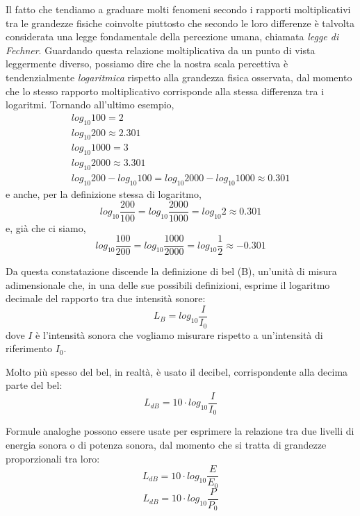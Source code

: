 \documentclass[11pt]{report}
\begin{document}
Il fatto che tendiamo a graduare molti fenomeni secondo i rapporti moltiplicativi tra le grandezze fisiche coinvolte piuttosto che secondo le loro differenze è talvolta considerata una legge fondamentale della percezione umana, chiamata \emph{legge di Fechner}. Guardando questa relazione moltiplicativa da un punto di vista leggermente diverso, possiamo dire che la nostra scala percettiva è tendenzialmente \emph{logaritmica} rispetto alla grandezza fisica osservata, dal momento che lo stesso rapporto moltiplicativo corrisponde alla stessa differenza tra i logaritmi. Tornando all'ultimo esempio,
\begin{equation}
\begin{aligned}
log_{10}100 = 2\\
log_{10}200 \approx 2.301\\
log_{10}1000 = 3\\
log_{10}2000 \approx 3.301\\
log_{10}200 - log_{10}100 = log_{10}2000 - log_{10}1000 \approx 0.301
\end{aligned}
\end{equation}
e anche, per la definizione stessa di logaritmo,
\begin{equation}
log_{10}\frac{200}{100} = log_{10}\frac{2000}{1000} = log_{10}2 \approx 0.301 
\end{equation}
e, già che ci siamo,
\begin{equation}
log_{10}\frac{100}{200} = log_{10}\frac{1000}{2000} = log_{10}\frac{1}{2} \approx -0.301 
\end{equation}

Da questa constatazione discende la definizione di bel (\unit{B}), un'unità di misura adimensionale che, in una delle sue possibili definizioni, esprime il logaritmo decimale del rapporto tra due intensità sonore:
\begin{equation}
L_{B} = log_{10}\frac{I}{I_0}
\end{equation}
dove $I$ è l'intensità sonora che vogliamo misurare rispetto a un'intensità di riferimento $I_0$. 

Molto più spesso del bel, in realtà, è usato il decibel, corrispondente alla decima parte del bel:
\begin{equation}
L_{dB} = 10 \cdot log_{10}\frac{I}{I_0}
\end{equation}

Formule analoghe possono essere usate per esprimere la relazione tra due livelli di energia sonora o di potenza sonora, dal momento che si tratta di grandezze proporzionali tra loro:
\begin{equation}
L_{dB} = 10 \cdot log_{10}\frac{E}{E_0}
\end{equation}
\begin{equation}
L_{dB} = 10 \cdot log_{10}\frac{P}{P_0}
\end{equation}
\end{document}
